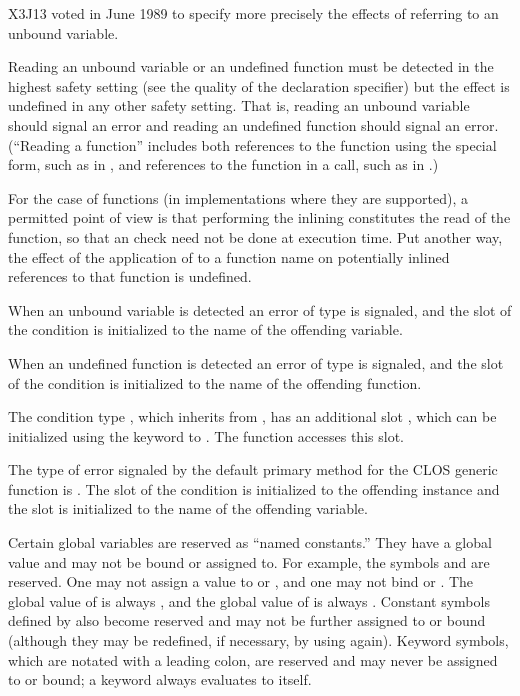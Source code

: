 \begin{newer}
X3J13 voted in June 1989 
to specify more precisely the effects of referring to an unbound variable.

  Reading an unbound variable or an undefined function
  must be detected in the highest safety setting (see the
   quality of the  declaration specifier)
  but the effect is undefined in any other safety setting. That is,
   reading an unbound variable should signal an error and
   reading an undefined function should signal an error.
  (``Reading a function'' includes
  both references to the function using the 
  special form, such as  in , and references to the
  function in a call, such as  in .)

  For the case of  functions (in implementations where they are
  supported), a permitted point of view is that performing the inlining
  constitutes the read of the function, so that an 
  check need not be done at
  execution time. Put another way, the effect of the application of
   to a function name
  on potentially inlined references to that function is undefined.

  When an unbound variable 
  is detected an error of type  is signaled,
  and the  slot of the
   condition is initialized to the name of the
  offending variable.

  When an undefined function
  is detected an error of type  is signaled,
  and the  slot of the
   condition is initialized to the name of the
  offending function.

  The condition type , which inherits from
  , has an additional slot , which
  can be initialized using the  keyword to .
  The function  accesses this slot.

  The type of error signaled by the default primary
  method for the CLOS  generic function is .
  The  slot
  of the  condition is initialized to the offending instance
  and the  slot is initialized
  to the name of the offending variable.
\end{newer}

Certain global variables are reserved as ``named constants.''
They have a global value and may not be bound or assigned to.
For example,
the symbols {\true} and {\false} are reserved.
One may not assign a value to {\true} or {\false},
and one may not bind {\true} or {\false}.  The global value of
{\true} is always {\true}, and the global value of
{\false} is always {\false}.  Constant symbols defined by
 also become reserved and may not be further
assigned to or bound (although they may be redefined, if necessary, by
using  again).  Keyword symbols,
which are notated with a leading colon, are reserved and
may never be assigned to or bound; a keyword always evaluates
to itself.

